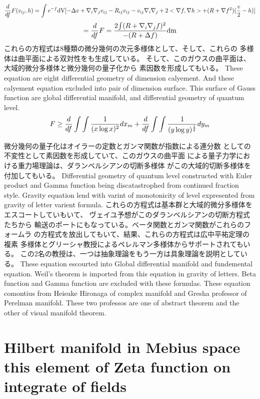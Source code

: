 \documentclass{jsarticle}
\begin{document}
  $$ {d \over d f}F(v_{ij},h) = \int {e^{-f}\mathrm{dV}}
  [- \Delta v + \nabla_{i}\nabla_{j}
  v_{ij} - R_{ij}v_{ij} - v_{ij}\nabla_{i}\nabla_{j} + 2 <\nabla f,\nabla h>
  + (R + \nabla f^2)({v \over 2} - h)]$$
  $$ = {d \over d f}F = {2 {\int (R + \nabla_{i}\nabla_{j} f)^2} \over 
  { - (R + \Delta f)}}\mathrm{dm} $$
  これらの方程式は8種類の微分幾何の次元多様体として、そして、これらの
  多様体は曲平面による双対性をも生成している。 
  そして、このガウスの曲平面は、大域的微分多様体と微分幾何の量子化から
  素因数を形成してもいる。
  These equation are eight differential geometry of dimension calyement.
  And these calyement equation excluded into pair of dimension surface.
  This surface of Gauss function are global differential manifold,
  and differential geometry of quantum level.
  $$ F \ge {d \over d f}\int \int{1 \over (x \log x)^2}dx_m 
  + {d \over d f}\int \int{1 \over (y \log y)^{1 \over 2}}dy_m $$

  微分幾何の量子化はオイラーの定数とガンマ関数が指数による連分数
  としての不変性として素因数を形成していて、このガウスの曲平面
  による量子力学における重力場理論は、ダランベルシアンの切断多様体
  がこの大域的切断多様体を付加してもいる。
  Differential geometry of quantum level constructed with Euler product
  and Gamma function being discatastrophed from continued fraction style.
  Gravity equation lend with varint of monotonicity of level expresented
  from gravity of letter varient formula.
  これらの方程式は基本群と大域的微分多様体をエスコートしていもいて、
  ヴェイユ予想がこのダランベルシアンの切断方程式たちから
  輸送のポートにもなっている。ベータ関数とガンマ関数がこれらのフォームラ
  の方程式を放出してもいて、結果、これらの方程式は広中平祐定理の複素
  多様体とグリーシャ教授によるペレルマン多様体からサポートされてもいる。
  この2名の教授は、一つは抽象理論をもう一方は具象理論を説明としている。
  These equation escourted into Global differential manifold and
  fundemental equation.
  Weil's theorem is imported from this equation in gravity of letters.
  Beta function and Gamma function are excluded with these formulas.
  These equation comontius from Heisuke Hironaga of complex manifold
  and Gresha professor of Perelman manifold.
  These two professos are one of abstract theorem and the other of
  visual manifold theorem.

\section{Hilbert manifold in Mebius space \\
        this element of Zeta function on integrate of fields}
\end{document}

